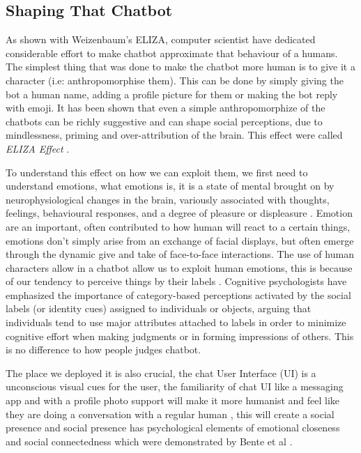 \documentclass{vgtc}                          %
\begin{document}
\subsection{Shaping That Chatbot}
As shown with Weizenbaum's ELIZA, computer scientist have dedicated considerable effort to make chatbot approximate that behaviour of a humans. The simplest thing that was done to make the chatbot more human is to give it a character (i.e: anthropomorphise them). This can be done by simply giving the bot a human name, adding a profile picture for them or making the bot reply with emoji. It has been shown that even a simple anthropomorphize of the chatbots can be richly suggestive and can shape social perceptions, due to mindlessness, priming and over-attribution of the brain. This effect were called \textit{ELIZA Effect} \cite{comppower}.

To understand this effect on how we can exploit them, we first need to understand emotions, what emotions is, it is a state of mental brought on by neurophysiological changes in the brain, variously associated with thoughts, feelings, behavioural responses, and a degree of pleasure or displeasure \cite{911197}. Emotion are an important, often contributed to how human will react to a certain things, emotions don’t simply arise from an exchange of facial displays, but often emerge through the dynamic give and take of face-to-face interactions. The use of human characters allow in a chatbot allow us to exploit human emotions, this is because of our tendency to perceive things by their labels \cite{doi:10.1287/isre.2021.1015}. Cognitive psychologists have emphasized the importance of category-based perceptions activated by the social labels (or identity cues) assigned to individuals or objects, arguing that individuals tend to use major attributes attached to labels in order to minimize cognitive effort when making judgments or in forming impressions of others. This is no difference to how people judges chatbot.

The place we deployed it is also crucial, the chat User Interface (UI) is a unconscious visual cues for the user, the familiarity of chat UI like a messaging app and with a profile photo support will make it more humanist and feel like they are doing a conversation with a regular human \cite{GO2019304}, this will create a social presence and social presence has psychological elements of emotional closeness and social connectedness which were demonstrated by Bente et al \cite{10.1111/j.1468-2958.2008.00322.x}. 
\end{document}
